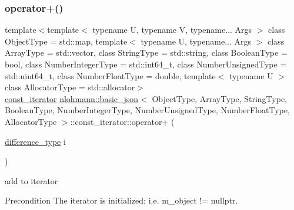 \subsubsection{\texorpdfstring{operator+()}{operator+()}}
{\footnotesize\ttfamily template$<$template$<$ typename U, typename V, typename... Args $>$ class Object\+Type = std\+::map, template$<$ typename U, typename... Args $>$ class Array\+Type = std\+::vector, class String\+Type  = std\+::string, class Boolean\+Type  = bool, class Number\+Integer\+Type  = std\+::int64\+\_\+t, class Number\+Unsigned\+Type  = std\+::uint64\+\_\+t, class Number\+Float\+Type  = double, template$<$ typename U $>$ class Allocator\+Type = std\+::allocator$>$ \\
\hyperlink{classnlohmann_1_1basic__json_1_1const__iterator}{const\+\_\+iterator} \hyperlink{classnlohmann_1_1basic__json}{nlohmann\+::basic\+\_\+json}$<$ Object\+Type, Array\+Type, String\+Type, Boolean\+Type, Number\+Integer\+Type, Number\+Unsigned\+Type, Number\+Float\+Type, Allocator\+Type $>$\+::const\+\_\+iterator\+::operator+ (\begin{DoxyParamCaption}\item[{\hyperlink{classnlohmann_1_1basic__json_1_1const__iterator_a49d7c3e9ef3280df03052cce988b792f}{difference\+\_\+type}}]{i }\end{DoxyParamCaption})\hspace{0.3cm}{\ttfamily [inline]}}



add to iterator 

\begin{DoxyPrecond}{Precondition}
The iterator is initialized; i.\+e. {\ttfamily m\+\_\+object != nullptr}. 
\end{DoxyPrecond}
\mbox{\label{classnlohmann_1_1basic__json_1_1const__iterator_a8dbaec5bf8ccba3225520356629061cb}} 
